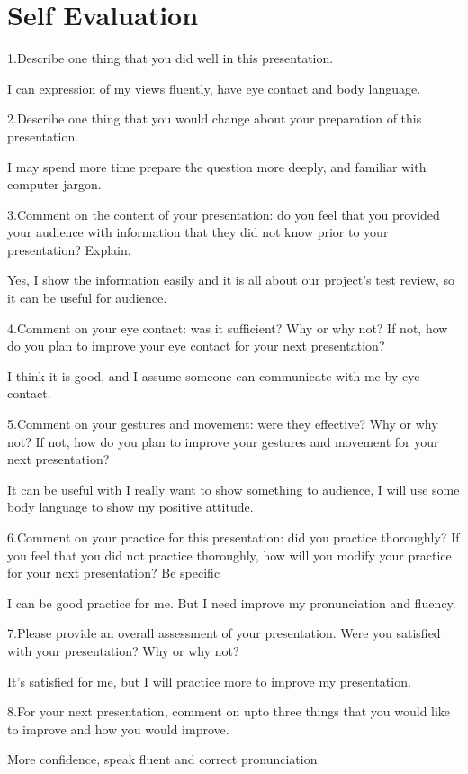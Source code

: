 \documentclass[12pt]{article}
\begin{document}
\section{Self Evaluation}
\begin {description}
\item1.Describe one thing that you did well in this presentation.
\item I can expression of my views fluently, have eye contact and body language.

\item2.Describe one thing that you would change about your preparation of this presentation. 

\item I may spend more time prepare the question more deeply, and familiar with computer jargon.

\item3.Comment on the content of your presentation: do you feel that you provided your audience with information that they did not know prior to your presentation? Explain. 
\item Yes, I show the information easily and it is all about our project's test review, so it can be useful for audience.

\item4.Comment on your eye contact: was it sufficient? Why or why not? If not, how do you plan to improve your eye contact for your next presentation? 
\item I think it is good, and I assume someone can communicate with me by eye contact.

\item5.Comment on your gestures and movement: were they effective? Why or why not? If not, how do you plan to improve your gestures and movement for your next presentation? 
\item It can be useful with I really want to show something to audience, I will use some body language to show my positive attitude.

\item6.Comment on your practice for this presentation: did you practice thoroughly? If you feel that you did not practice thoroughly, how will you modify your practice for your next presentation? Be specific 
\item I can be good practice for me. But I need improve my pronunciation and fluency.

\item7.Please provide an overall assessment of your presentation. Were you satisfied with your presentation? Why or why not?
\item It's satisfied for me, but I will practice more to improve my presentation.

\item8.For your next presentation, comment on upto three things that you would like to improve and how you would improve.
\item  More confidence, speak fluent and correct pronunciation



\end{description}
\end{document}
